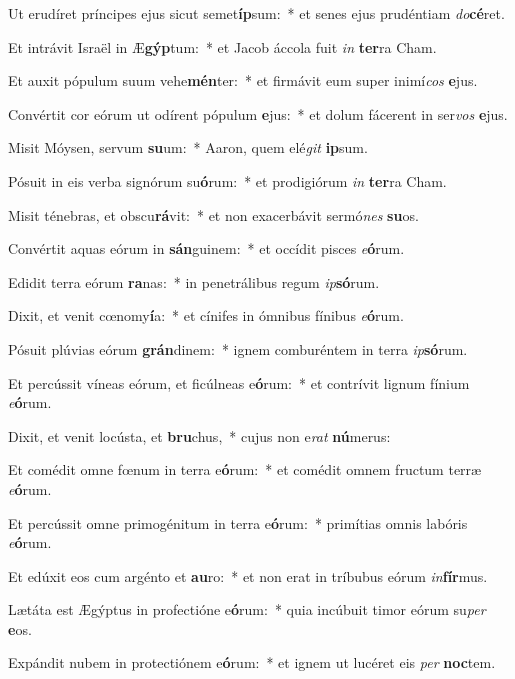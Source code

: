 \item Ut erudíret príncipes ejus sicut semet\textbf{íp}sum:~* et senes ejus prudéntiam \textit{do}\textbf{cé}ret.
\item Et intrávit Israël in Æ\textbf{gýp}tum:~* et Jacob áccola fuit \textit{in} \textbf{ter}ra Cham.
\item Et auxit pópulum suum vehe\textbf{mén}ter:~* et firmávit eum super inimí\textit{cos} \textbf{e}jus.
\item Convértit cor eórum ut odírent pópulum \textbf{e}jus:~* et dolum fácerent in ser\textit{vos} \textbf{e}jus.
\item Misit Móysen, servum \textbf{su}um:~* Aaron, quem elé\textit{git} \textbf{ip}sum.
\item Pósuit in eis verba signórum su\textbf{ó}rum:~* et prodigiórum \textit{in} \textbf{ter}ra Cham.
\item Misit ténebras, et obscu\textbf{rá}vit:~* et non exacerbávit sermó\textit{nes} \textbf{su}os.
\item Convértit aquas eórum in \textbf{sán}guinem:~* et occídit pisces \textit{e}\textbf{ó}rum.
\item Edidit terra eórum \textbf{ra}nas:~* in penetrálibus regum \textit{ip}\textbf{só}rum.
\item Dixit, et venit cœnomy\textbf{í}a:~* et cínifes in ómnibus fínibus \textit{e}\textbf{ó}rum.
\item Pósuit plúvias eórum \textbf{grán}dinem:~* ignem comburéntem in terra \textit{ip}\textbf{só}rum.
\item Et percússit víneas eórum, et ficúlneas e\textbf{ó}rum:~* et contrívit lignum fínium \textit{e}\textbf{ó}rum.
\item Dixit, et venit locústa, et \textbf{bru}chus,~* cujus non e\textit{rat} \textbf{nú}merus:
\item Et comédit omne fœnum in terra e\textbf{ó}rum:~* et comédit omnem fructum terræ \textit{e}\textbf{ó}rum.
\item Et percússit omne primogénitum in terra e\textbf{ó}rum:~* primítias omnis labóris \textit{e}\textbf{ó}rum.
\item Et edúxit eos cum argénto et \textbf{au}ro:~* et non erat in tríbubus eórum \textit{in}\textbf{fír}mus.
\item Lætáta est Ægýptus in profectióne e\textbf{ó}rum:~* quia incúbuit timor eórum su\textit{per} \textbf{e}os.
\item Expándit nubem in protectiónem e\textbf{ó}rum:~* et ignem ut lucéret eis \textit{per} \textbf{noc}tem.

